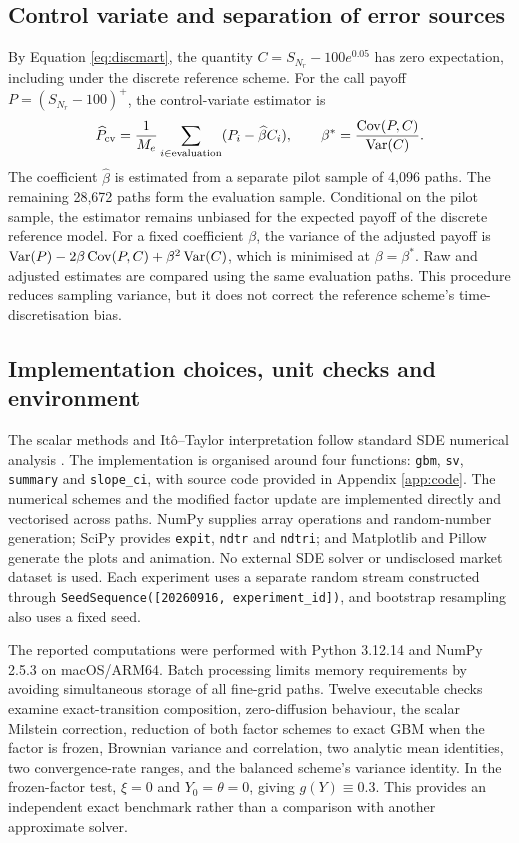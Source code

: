 \subsection{Control variate and separation of error sources}
By Equation \eqref{eq:discmart}, the quantity $C=S_{N_r}-100e^{0.05}$ has zero expectation, including under the discrete reference scheme. For the call payoff $P=(S_{N_r}-100)^+$, the control-variate estimator is
\begin{equation}\label{eq:cv}
\widehat P_{\rm cv}=\frac1{M_e}\sum_{i\in\mathrm{evaluation}}(P_i-\widehat\beta C_i),\qquad
\beta^*=\frac{\operatorname{Cov}(P,C)}{\operatorname{Var}(C)}.
\end{equation}
The coefficient $\widehat\beta$ is estimated from a separate pilot sample of 4,096 paths. The remaining 28,672 paths form the evaluation sample. Conditional on the pilot sample, the estimator remains unbiased for the expected payoff of the discrete reference model. For a fixed coefficient $\beta$, the variance of the adjusted payoff is $\operatorname{Var}(P)-2\beta\operatorname{Cov}(P,C)+\beta^2\operatorname{Var}(C)$, which is minimised at $\beta=\beta^*$. Raw and adjusted estimates are compared using the same evaluation paths. This procedure reduces sampling variance, but it does not correct the reference scheme's time-discretisation bias.

\subsection{Implementation choices, unit checks and environment}
The scalar methods and It\^o--Taylor interpretation follow standard SDE numerical analysis \cite{kloeden,higham}. The implementation is organised around four functions: \texttt{gbm}, \texttt{sv}, \texttt{summary} and \texttt{slope\_ci}, with source code provided in Appendix \ref{app:code}. The numerical schemes and the modified factor update are implemented directly and vectorised across paths. NumPy \cite{numpy} supplies array operations and random-number generation; SciPy \cite{scipy} provides \texttt{expit}, \texttt{ndtr} and \texttt{ndtri}; and Matplotlib and Pillow generate the plots and animation. No external SDE solver or undisclosed market dataset is used. Each experiment uses a separate random stream constructed through \texttt{SeedSequence([20260916, experiment\_id])}, and bootstrap resampling also uses a fixed seed.

The reported computations were performed with Python 3.12.14 and NumPy 2.5.3 on macOS/ARM64. Batch processing limits memory requirements by avoiding simultaneous storage of all fine-grid paths. Twelve executable checks examine exact-transition composition, zero-diffusion behaviour, the scalar Milstein correction, reduction of both factor schemes to exact GBM when the factor is frozen, Brownian variance and correlation, two analytic mean identities, two convergence-rate ranges, and the balanced scheme's variance identity. In the frozen-factor test, $\xi=0$ and $Y_0=\theta=0$, giving $g(Y)\equiv0.3$. This provides an independent exact benchmark rather than a comparison with another approximate solver.

